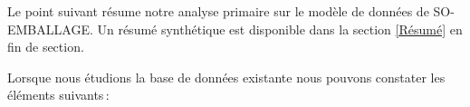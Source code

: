 
Le point suivant résume notre analyse primaire sur le modèle de données de SO-EMBALLAGE. Un résumé synthétique est disponible dans la section \ref{Résumé} en fin de section.  \vertspace 


Lorsque nous étudions la base de données existante nous pouvons constater les éléments suivants :  

